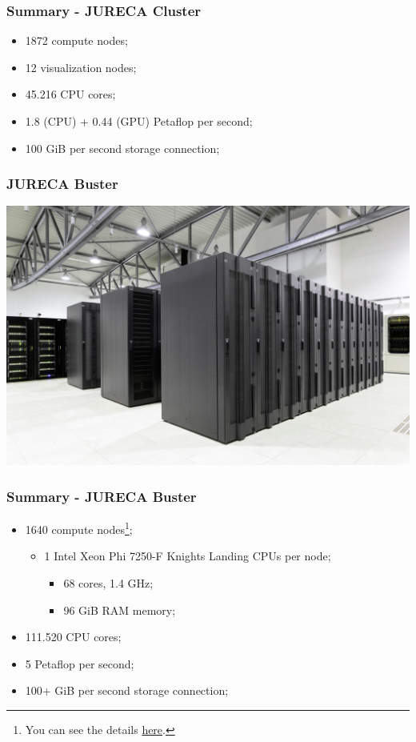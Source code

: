 \documentclass{beamer}
\begin{document}
\begin{frame}
  \frametitle{Summary - JURECA Cluster}
  \begin{itemize}
    \item 1872 compute nodes;
    \item 12 visualization nodes;
    \item 45.216 CPU cores;
    \item 1.8 (CPU) + 0.44 (GPU) Petaflop per second;
    \item 100 GiB per second storage connection;
  \end{itemize}
\end{frame}

\begin{frame}
  \frametitle{JURECA Buster}
  \includegraphics[width=\textwidth]{./images/jureca-buster.jpeg}
\end{frame}

\begin{frame}
  \frametitle{Summary - JURECA Buster}
  \begin{itemize}
    \item 1640 compute nodes\footnote{You can see the details \href{https://www.fz-juelich.de/ias/jsc/EN/Expertise/Supercomputers/JURECA/Configuration/Configuration_node.html}{here}.};
          \begin{itemize}
            \item 1 Intel Xeon Phi 7250-F Knights Landing CPUs per node;
                  \begin{itemize}
                    \item 68 cores, 1.4 GHz;
                    \item 96 GiB RAM memory;
                  \end{itemize}
          \end{itemize}
    \item 111.520 CPU cores;
    \item 5 Petaflop per second;
    \item 100+ GiB per second storage connection;
  \end{itemize}
\end{frame}
\end{document}
